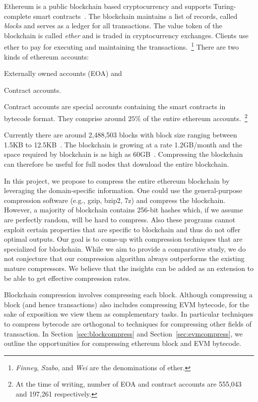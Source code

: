 
Ethereum is a public blockchain based cryptocurrency and supports Turing-complete smart contracts~\cite{ethereum}.
The blockchain maintains a list of records, called \emph{blocks} and serves as a ledger for all transactions.
The value token of the blockchain is called \emph{ether} and 
is traded in cryptocurrency exchanges.
Clients use ether to pay for executing and maintaining the transactions.~\footnote{
\emph{Finney}, \emph{Szabo}, and \emph{Wei} are the denominations of ether.}
There are two kinds of ethereum accounts: 
\begin{enumerate*}
	\item Externally owned accounts (EOA) and
	\item Contract accounts.
\end{enumerate*}
Contract accounts are special accounts containing the smart contracts in bytecode format. They comprise around $25\%$ of the entire ethereum accounts.~\footnote{
At the time of writing, number of EOA and contract accounts are 555,043 and 197,261 respectively.}  
 
Currently there are around 2,488,503 blocks with block size ranging between 1.5KB to 12.5KB~\cite{ethblocksize}.  
The blockchain is growing at a rate 1.2GB/month and
the space required by blockchain is as high as 60GB~\cite{ethdiskspace}.
Compressing the blockchain can therefore be useful for full nodes that download the entire blockchain.

In this project, we propose to compress the entire ethereum blockchain by leveraging the domain-specific information.
One could use the general-purpose compression software (e.g., gzip, bzip2, 7z) and compress the blockchain.
However, a majority of blockchain contains 256-bit hashes which, if we assume are perfectly random, will be hard to compress.
Also these programs cannot exploit certain properties that are specific to blockchain and thus do not offer optimal outputs.
Our goal is to come-up with compression techniques that  are specialized for blockchain.
While we aim to provide a comparative study, we do not conjecture that our compression algorithm always outperforms the existing mature compressors.
We believe that the insights can be added as an extension to be able to get effective compression rates.   

Blockchain compression involves compressing each block.
Although compressing a block (and hence transactions) also includes compressing EVM bytecode, 
for the sake of exposition we view them as complementary tasks. 
In particular techniques to compress bytecode are orthogonal to techniques for compressing other fields of transaction.
In Section~\ref{sec:blockcompress} and 
Section~\ref{sec:evmcompress}, we   
outline the opportunities for compressing ethereum block and EVM bytecode. 

